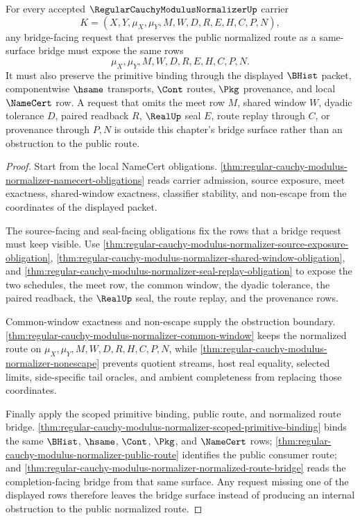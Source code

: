 \begin{theorem}
\label{thm:regular-cauchy-modulus-normalizer-bridge-obstruction-boundary}
For every accepted $\RegularCauchyModulusNormalizerUp$ carrier
$$
K=(X,Y,\mu_X,\mu_Y,M,W,D,R,E,H,C,P,N),
$$
any bridge-facing request that preserves the public normalized route as a same-surface bridge must expose the same rows
$$
\mu_X,\mu_Y,M,W,D,R,E,H,C,P,N .
$$
It must also preserve the primitive binding through the displayed $\BHist$
packet, componentwise $\hsame$ transports, $\Cont$ routes, $\Pkg$ provenance,
and local $\NameCert$ row. A request that omits the meet row $M$, shared
window $W$, dyadic tolerance $D$, paired readback $R$, $\RealUp$ seal $E$,
route replay through $C$, or provenance through $P,N$ is outside this chapter's
bridge surface rather than an obstruction to the public route.
\end{theorem}
\begin{proof}
Start from the local NameCert obligations.
\autoref{thm:regular-cauchy-modulus-normalizer-namecert-obligations} reads
carrier admission, source exposure, meet exactness, shared-window exactness,
classifier stability, and non-escape from the coordinates of the displayed
packet.

The source-facing and seal-facing obligations fix the rows that a bridge request
must keep visible. Use
\autoref{thm:regular-cauchy-modulus-normalizer-source-exposure-obligation},
\autoref{thm:regular-cauchy-modulus-normalizer-shared-window-obligation}, and
\autoref{thm:regular-cauchy-modulus-normalizer-seal-replay-obligation} to expose
the two schedules, the meet row, the common window, the dyadic tolerance, the
paired readback, the $\RealUp$ seal, the route replay, and the provenance rows.

Common-window exactness and non-escape supply the obstruction boundary.
\autoref{thm:regular-cauchy-modulus-normalizer-common-window} keeps the
normalized route on $\mu_X,\mu_Y,M,W,D,R,H,C,P,N$, while
\autoref{thm:regular-cauchy-modulus-normalizer-nonescape} prevents quotient
streams, host real equality, selected limits, side-specific tail oracles, and
ambient completeness from replacing those coordinates.

Finally apply the scoped primitive binding, public route, and normalized route
bridge. \autoref{thm:regular-cauchy-modulus-normalizer-scoped-primitive-binding}
binds the same $\BHist$, $\hsame$, $\Cont$, $\Pkg$, and $\NameCert$ rows;
\autoref{thm:regular-cauchy-modulus-normalizer-public-route} identifies the
public consumer route; and
\autoref{thm:regular-cauchy-modulus-normalizer-normalized-route-bridge} reads
the completion-facing bridge from that same surface. Any request missing one of
the displayed rows therefore leaves the bridge surface instead of producing an
internal obstruction to the public normalized route.
\end{proof}

